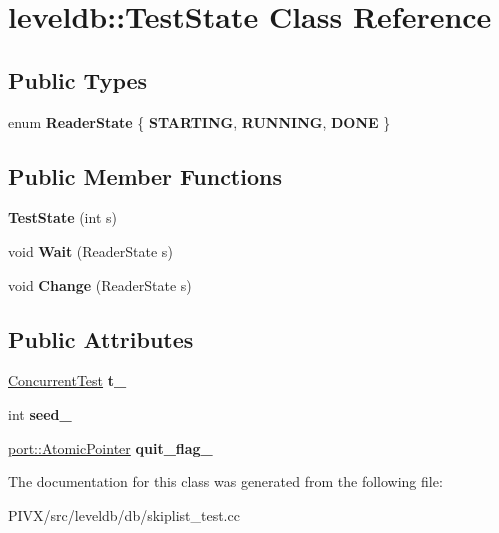 \hypertarget{classleveldb_1_1_test_state}{}\section{leveldb\+:\+:Test\+State Class Reference}
\label{classleveldb_1_1_test_state}
\subsection*{Public Types}
\begin{DoxyCompactItemize}
\item 
\mbox{\label{classleveldb_1_1_test_state_a1bf1f0a16815237ff1f29d2925d9a4ad}} 
enum {\bfseries Reader\+State} \{ {\bfseries S\+T\+A\+R\+T\+I\+NG}, 
{\bfseries R\+U\+N\+N\+I\+NG}, 
{\bfseries D\+O\+NE}
 \}
\end{DoxyCompactItemize}
\subsection*{Public Member Functions}
\begin{DoxyCompactItemize}
\item 
\mbox{\label{classleveldb_1_1_test_state_a777f2182bef5c524d580dc26ec589c2d}} 
{\bfseries Test\+State} (int s)
\item 
\mbox{\label{classleveldb_1_1_test_state_ab11f5574ad50202e18e8274e16953f0a}} 
void {\bfseries Wait} (Reader\+State s)
\item 
\mbox{\label{classleveldb_1_1_test_state_ae63a695f700220714efa0e622511740c}} 
void {\bfseries Change} (Reader\+State s)
\end{DoxyCompactItemize}
\subsection*{Public Attributes}
\begin{DoxyCompactItemize}
\item 
\mbox{\label{classleveldb_1_1_test_state_a090fd0c59fb141c4843511b4020f05e9}} 
\mbox{\hyperlink{classleveldb_1_1_concurrent_test}{Concurrent\+Test}} {\bfseries t\+\_\+}
\item 
\mbox{\label{classleveldb_1_1_test_state_aa44f519b574945b0061c88df42fd4725}} 
int {\bfseries seed\+\_\+}
\item 
\mbox{\label{classleveldb_1_1_test_state_a04e07cf69866e925db3fafd5cf9fa23f}} 
\mbox{\hyperlink{classleveldb_1_1port_1_1_atomic_pointer}{port\+::\+Atomic\+Pointer}} {\bfseries quit\+\_\+flag\+\_\+}
\end{DoxyCompactItemize}


The documentation for this class was generated from the following file\+:\begin{DoxyCompactItemize}
\item 
P\+I\+V\+X/src/leveldb/db/skiplist\+\_\+test.\+cc\end{DoxyCompactItemize}

